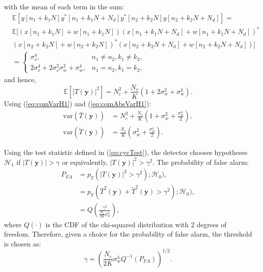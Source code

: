 \documentclass[11pt]{article}
\newcommand{\by}{\mathbf{y}}
\newcommand{\Ex}{\mathbb{E}}
\newcommand{\cH}{\mathcal{H}}
\begin{document}
with the mean of each term in the sum:
\begin{equation*}
\begin{split}
&\Ex \left[ y[n_{1}+k_{1}N] y^{*}[n_{1}+k_{1}N+N_{d}] y^{*}[n_{2}+k_{2}N] y[n_{2}+k_{2}N+N_{d}] \right] = \\
&\Ex [\left(x[n_{1}+k_{1}N] + w[n_{1}+k_{1}N]\right) \left(x[n_{1}+k_{1}N+N_{d}] + w[n_{1}+k_{1}N+N_{d}]\right)^{*} \\
&\left(x[n_{2}+k_{2}N] + w[n_{2}+k_{2}N]\right)^{*} \left(x[n_{2}+k_{2}N+N_{d}] + w[n_{2}+k_{2}N+N_{d}]\right)] \\
&= \begin{cases}
	\sigma_{s}^{4}, & n_{1} \neq n_{2}, k_{1} \neq k_{2}, \\
	2\sigma_{s}^{4} + 2\sigma_{s}^{2}\sigma_{w}^{2} + \sigma_{w}^{4}, & n_{1} = n_{2}, k_{1} = k_{2},
\end{cases}
\end{split}
\end{equation*}
and hence,
\begin{equation}
	\Ex\left[ \vert T(\by) \vert^{2} \right] = N_{c}^{2} + \frac{N_{c}}{K}\left( 1 + 2\sigma_{w}^{2} + \sigma_{w}^{4} \right).
\label{eq:comAbsVarH1}
\end{equation}
Using (\ref{eq:comVarH1}) and (\ref{eq:comAbsVarH1}):
\begin{equation}
\begin{split}
	\mathrm{var}\left( \bar{T}(\by) \right) &= N_{c}^{2} + \frac{N_{c}}{K}\left( 1 + \sigma_{w}^{2} + \frac{\sigma_{w}^{4}}{2} \right), \\
	\mathrm{var}\left( \tilde{T}(\by) \right) &= \frac{N_{c}}{K}\left(\sigma_{w}^{2} + \frac{\sigma_{w}^{4}}{2} \right).
\end{split}
\label{eq:VarH1}
\end{equation}

\noindent {} Using the test statistic defined in (\ref{eq:cycTest}), the detector chooses hypotheses $\cH_{1}$ if $\vert T(\by) \vert > \gamma$ or equivalently, $\vert T(\by) \vert^{2} > \gamma^{2}$. The probability of false alarm:
\begin{equation}
\begin{split}
	P_{FA} &= p_{Y}(\vert T(\by) \vert^{2} > \gamma^{2}) ; \cH_{0}), \\
	&= p_{Y}(\bar{T}^{2}(\by) + \tilde{T}^{2}(\by) > \gamma^{2}) ; \cH_{0}), \\
	&= Q \left( \frac{\gamma^{2}}{\frac{N_{c}}{2K}\sigma_{w}^{4}} \right),
\end{split}
\label{eq:cycPfa}
\end{equation}
where $Q(\cdot)$ is the CDF of the chi-squared distribution with $2$ degrees of freedom. Therefore, given a choice for the probability of false alarm, the threshold is chosen as:
\begin{equation}
	\gamma = \left( \frac{N_{c}}{2K}\sigma_{w}^{4} Q^{-1}(P_{FA}) \right)^{1/2}.
\label{eq:cycThresh}
\end{equation}
\end{document}
